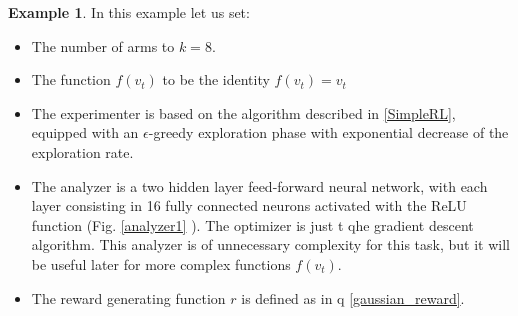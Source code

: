 \documentclass[11pt,a4paper,twoside]{report}
\newcommand{\+}{\textnormal{+} }
\theoremstyle{definition}
\newtheorem{myex}[mythm]{Example}
\numberwithin{equation}{chapter}
\begin{document}
\begin{myex}
    In this example let us set:

    \begin{itemize}
      \item The number of arms to $k=8$.
      \item The function $f(v_t)$ to be the identity $f(v_t)=v_t$
      \item The experimenter is based on the algorithm described in
      \ref{SimpleRL}, equipped with an $\epsilon$-greedy exploration phase with
      exponential decrease of the exploration rate. 
      \item The analyzer is a two hidden layer feed-forward neural network, with
      each layer consisting in 16 fully connected neurons activated with the
      ReLU function (Fig. \ref{analyzer1} ). The optimizer is just t qhe
      gradient descent algorithm. This analyzer is of unnecessary complexity for
      this task, but it will be useful later for more complex functions
      $f(v_t)$.
      \item The reward generating function $r$ is defined as in q
      \eqref{gaussian_reward}.
    \end{itemize}


\end{myex}
\end{document}
